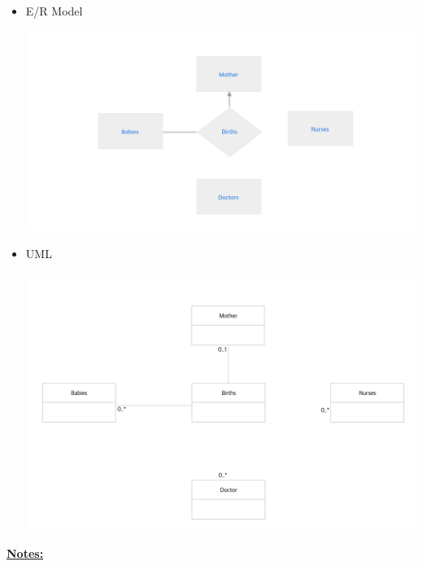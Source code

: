 \documentclass[12pt]{article}
\begin{document}
\begin{enumerate}[1.]
\begin{enumerate}[a)]
\begin{mdframed}
            \begin{itemize}
                \item E/R Model
                \begin{center}
                \includegraphics[width=\linewidth]{images/worksheet_15_solution_28.png}
                \end{center}

                \item UML

                \begin{center}
                \includegraphics[width=\linewidth]{images/worksheet_15_solution_29.png}
                \end{center}
            \end{itemize}

        \end{mdframed}

        \bigskip

        \underline{\textbf{Notes:}}

        \bigskip


\end{enumerate}
\end{enumerate}
\end{document}
